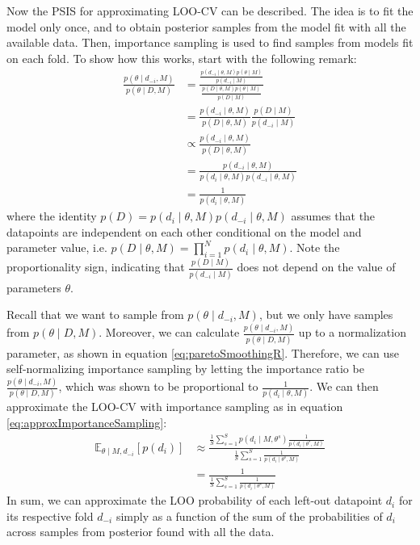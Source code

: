 \documentclass[a4paper,12pt,twoside]{article}
\begin{document}
Now the PSIS for approximating LOO-CV can be described. The idea is to fit the model only once, and to obtain posterior samples from the model fit with all the available data. Then, importance sampling is used to find samples from models fit on each fold. To show how this works, start with the following remark:
\begin{align}\label{eq:paretoSmoothingR}
\frac{p(\theta \mid d_{-i}, M)}{p(\theta \mid D, M)} & = 
\frac{
\frac{p(d_{-i} \mid \theta, M)p(\theta \mid M)}{p(d_{-i} \mid M)}
}{
\frac{p(D \mid \theta, M)p(\theta \mid M )}{p(D \mid M)}
}\\
& = \frac{p(d_{-i} \mid \theta, M)}{p(D \mid \theta, M)}\frac{p(D \mid M)}{p(d_{-i} \mid M)}\\
& \propto \frac{p(d_{-i} \mid \theta, M)}{p(D \mid \theta, M)} \\
& = \frac{p(d_{-i} \mid \theta, M)}{p(d_i \mid \theta, M)p(d_{-i} \mid \theta, M)}\\
& = \frac{1}{p(d_i \mid \theta, M)}
\end{align}
where the identity $p(D) = p(d_i \mid \theta, M)p(d_{-i} \mid \theta, M)$ assumes that the datapoints are independent on each other conditional on the model and parameter value, i.e. $p(D \mid \theta, M) = \prod_{i=1}^N p( d_i \mid \theta, M)$. Note the proportionality sign, indicating that $\frac{p(D \mid M)}{p(d_{-i} \mid M)}$ does not depend on the value of parameters $\theta$.

Recall that we want to sample from $p(\theta \mid d_{-i}, M)$, but we only have samples from $p(\theta \mid D, M)$. Moreover, we can calculate $\frac{p(\theta \mid d_{-i}, M)}{p(\theta \mid D, M)}$ up to a normalization parameter, as shown in equation \ref{eq:paretoSmoothingR}. Therefore, we can use self-normalizing importance sampling by letting the importance ratio be $\frac{p(\theta \mid d_{-i}, M)}{p(\theta \mid D, M)}$, which was shown to be proportional to $\frac{1}{p(d_i \mid \theta, M)}$. We can then approximate the LOO-CV with importance sampling as in equation \ref{eq:approxImportanceSampling}:
\begin{align}
\mathbb{E}_{\theta \mid M, d_{-i}} \left[ p(d_i) \right] 
& \approx 
\frac{\frac{1}{S}\sum_{s=1}^S p( d_i \mid M, \theta^s) \frac{1}{p(d_i \mid \theta^s, M)}}{\frac{1}{S}\sum_{s=1}^S \frac{1}{p(d_i \mid \theta^s, M)}} \\
& = 
\frac{1}{\frac{1}{S}\sum_{s=1}^S \frac{1}{p(d_i \mid \theta^s, M)}}
\end{align}
In sum, we can approximate the LOO probability of each left-out datapoint $d_i$ for its respective fold $d_{-i}$ simply as a function of the sum of the probabilities of $d_i$ across samples from posterior found with all the data.
\end{document}
